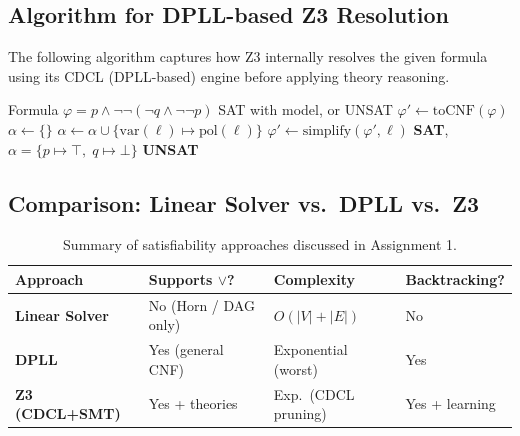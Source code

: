 \documentclass[11pt, a4paper]{article}
\begin{document}
\subsection{Algorithm for DPLL-based Z3 Resolution}

The following algorithm captures how Z3 internally resolves the given formula
using its CDCL (DPLL-based) engine before applying theory reasoning.

\begin{algorithm}[H]
\caption{Z3 CDCL Resolution of $p \land \lnot\lnot(\lnot q \land \lnot\lnot p)$}
\begin{algorithmic}[1]
\Require Formula $\varphi = p \land \lnot\lnot(\lnot q \land \lnot\lnot p)$
\Ensure SAT with model, or UNSAT
\State $\varphi' \gets \mathrm{toCNF}(\varphi)$
\State $\alpha \gets \{\}$
  \State $\alpha \gets \alpha \cup \{\mathrm{var}(\ell) \mapsto \mathrm{pol}(\ell)\}$
  \State $\varphi' \gets \mathrm{simplify}(\varphi', \ell)$
\EndWhile
{}
  \Return \textbf{SAT}, $\alpha = \{p \mapsto \top,\; q \mapsto \bot\}$
\EndIf
\Return \textbf{UNSAT}
\end{algorithmic}
\end{algorithm}

\subsection{Comparison: Linear Solver vs.\ DPLL vs.\ Z3}

\begin{table}[H]
\centering
\setlength{\tabcolsep}{8pt}
\renewcommand{\arraystretch}{1.3}
\begin{tabularx}{0.92\linewidth}{>{\bfseries}l X X X}
\toprule
\rowcolor{primaryblue}
{\color{white}Approach} &
{\color{white}Supports $\lor$?} &
{\color{white}Complexity} &
{\color{white}Backtracking?} \\
\midrule
Linear Solver & No (Horn / DAG only) & $O(|V|+|E|)$ & No \\
\rowcolor{lightblue}
DPLL & Yes (general CNF) & Exponential (worst) & Yes \\
Z3 (CDCL+SMT) & Yes + theories & Exp.\ (CDCL pruning) & Yes + learning \\
\bottomrule
\end{tabularx}
\caption{Summary of satisfiability approaches discussed in Assignment 1.}
\end{table}
\end{document}
